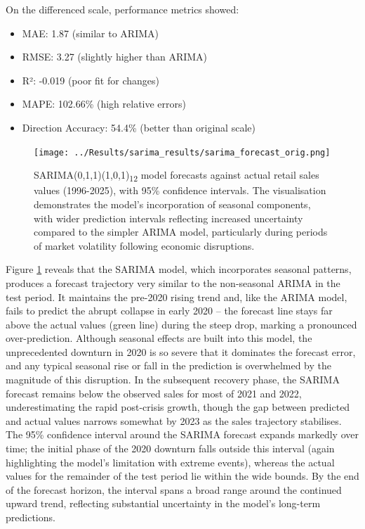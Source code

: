 \documentclass[12pt,a4paper]{report}
\begin{document}
On the differenced scale, performance metrics showed:
\begin{itemize}
    \item MAE: 1.87 (similar to ARIMA)
    \item RMSE: 3.27 (slightly higher than ARIMA)
    \item R²: -0.019 (poor fit for changes)
    \item MAPE: 102.66\% (high relative errors)
    \item Direction Accuracy: 54.4\% (better than original scale)
\end{itemize}

\begin{figure}[htbp]
\centering
\texttt{[image: ../Results/sarima\_results/sarima\_forecast\_orig.png]}
\caption{SARIMA(0,1,1)(1,0,1)\textsubscript{12} model forecasts against actual retail sales values (1996-2025), with 95\% confidence intervals. The visualisation demonstrates the model's incorporation of seasonal components, with wider prediction intervals reflecting increased uncertainty compared to the simpler ARIMA model, particularly during periods of market volatility following economic disruptions.}
\label{fig:sarima_forecast}
\end{figure}

Figure \ref{fig:sarima_forecast} reveals that the SARIMA model, which incorporates seasonal patterns, produces a forecast trajectory very similar to the non-seasonal ARIMA in the test period. It maintains the pre-2020 rising trend and, like the ARIMA model, fails to predict the abrupt collapse in early 2020 – the forecast line stays far above the actual values (green line) during the steep drop, marking a pronounced over-prediction. Although seasonal effects are built into this model, the unprecedented downturn in 2020 is so severe that it dominates the forecast error, and any typical seasonal rise or fall in the prediction is overwhelmed by the magnitude of this disruption. In the subsequent recovery phase, the SARIMA forecast remains below the observed sales for most of 2021 and 2022, underestimating the rapid post-crisis growth, though the gap between predicted and actual values narrows somewhat by 2023 as the sales trajectory stabilises. The 95\% confidence interval around the SARIMA forecast expands markedly over time; the initial phase of the 2020 downturn falls outside this interval (again highlighting the model's limitation with extreme events), whereas the actual values for the remainder of the test period lie within the wide bounds. By the end of the forecast horizon, the interval spans a broad range around the continued upward trend, reflecting substantial uncertainty in the model's long-term predictions.
\end{document}
